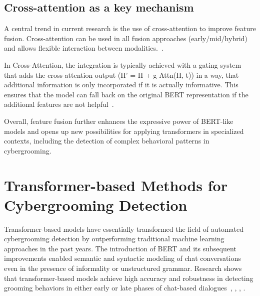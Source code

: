 \subsection{Cross-attention as a key mechanism}
A central trend in current research is the use of cross-attention to improve feature fusion. Cross-attention can be used in all fusion approaches (early/mid/hybrid) and allows flexible interaction between modalities.~\parencite{nagrani2021attention,khan2020mmft}. 
   
In Cross-Attention, the integration is typically achieved with a gating system that adds the cross-attention output (H' = H + g \odot Attn(H, t)) in a way, that additional information is only incorporated if it is actually informative. This ensures that the model can fall back on the original BERT representation if the additional features are not helpful~\parencite{cai2025multimodal}.

Overall, feature fusion further enhances the expressive power of BERT-like models and opens up new possibilities for applying transformers in specialized contexts, including the detection of complex behavioral patterns in cybergrooming.


\section{Transformer-based Methods for Cybergrooming Detection}

Transformer-based models have essentially transformed the field of automated cybergrooming detection by outperforming traditional machine learning approaches in the past years. The introduction of BERT and its subsequent improvements enabled semantic and syntactic modeling of chat conversations even in the presence of informality or unstructured grammar. Research shows that transformer-based models achieve high accuracy and robustness in detecting grooming behaviors in either early or late phases of chat-based dialogues~\parencite{vogt2021early}, \cite{street2024grooming}, \cite{borj2022online}, \cite{hamm2025llms}.

